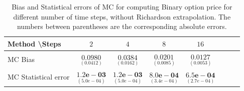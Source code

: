 \documentclass[11pt]{article}
\begin{document}
\begin{table}[h!]
	\centering
	\begin{tabular}{l*{6}{c}r}
		Method \textbackslash  Steps            & $2$ & $4$ & $8$ & $16$  \\
		\hline
		MC Bias   & 	$ \underset{(    
			0.0412)}{\mathbf{0.0980}}$  & $\underset{( 0.0162)}{\mathbf{ 0.0384
		}}$  & $\underset{(    0.0085
	)}{\mathbf{0.0201}}$ & $\underset{(   0.0053)}{\mathbf{   0.0127}}$\\ 
		
		MC Statistical error  &  $\underset{( 5.0e-04)} {\mathbf{1.2e-03}}$  & $\underset{( 5.0e-04)} {\mathbf{1.2e-03}}$ & $\underset{(3.4e-04)} {\mathbf{8.0e-04}}$ & $\underset{( 2.7e-04)} {\mathbf{6.5e-04}}$	\\
		\hline
	\end{tabular}
	\caption{Bias and Statistical errors of MC  for computing Binary option price  for different number of time steps, without Richardson extrapolation. The numbers between parentheses are the corresponding absolute errors.}
	\label{Bias and Statistical errors of MC  for computing Binary option price  for different number of time steps, without Richardson extrapolation. The numbers between parentheses are the corresponding absolute errors.}
\end{table}
\end{document}
